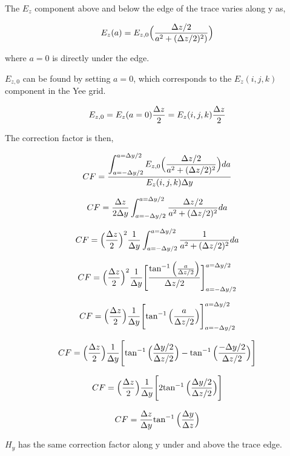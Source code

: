 \documentclass{article}
\begin{document}
The \(E_z\) component above and below the edge of the trace varies along y as,

\[E_z(a) = E_{z,0} \Big( {\Delta z /2 \over a^2 + (\Delta z / 2)^2) }\Big)\]

where \(a=0\) is directly under the edge.

\( E_{z,0}\) can be found by setting \(a=0\), which corresponds to the \(E_z(i,j,k)\) component in the Yee grid.

\[E_{z,0} = E_z(a=0)  {\Delta z \over 2} = E_z(i,j,k) {\Delta z \over 2}\]

The correction factor is then,

\[ CF = {\displaystyle \int_{a=-\Delta y /2}^{a=\Delta y / 2}  {E_{z,0} \Big( {\Delta z /2\over a^2 + (\Delta z/2)^2 }\Big)}  da \over  E_z(i,j,k) \Delta y}\]

\[ CF =  {\Delta z \over 2 \Delta y} \int_{a=-\Delta y /2}^{a=\Delta y / 2}  { {\Delta z /2 \over a^2 + (\Delta z /2)^2 }}  da \]

\[ CF = \Big({\Delta z \over 2 }\Big)^2 {1 \over \Delta y}\int_{a=-\Delta y /2}^{a=\Delta y / 2}  { {1\over a^2 + (\Delta z /2)^2 }}  da \]

\[ CF = \Big({\Delta z \over 2 }\Big)^2 {1 \over \Delta y} \Bigg[ {\tan^{-1} \Big({a \over \Delta z /2}\Big) \over \Delta z /2 } \Bigg]_{a=-\Delta y /2}^{a=\Delta y / 2}  \]

\[ CF = \Big({\Delta z \over 2 }\Big) {1 \over \Delta y} \Bigg[ {\tan^{-1} \Big({a \over \Delta z /2}\Big) } \Bigg]_{a=-\Delta y /2}^{a=\Delta y / 2}  \]

\[ CF = \Big({\Delta z \over 2 }\Big) {1 \over \Delta y} \Bigg[ {\tan^{-1} \Big({\Delta y / 2 \over \Delta z /2}\Big) - \tan^{-1} \Big({-\Delta y / 2 \over \Delta z /2}\Big)} \Bigg]\]

\[ CF = \Big({\Delta z \over 2 }\Big) {1 \over \Delta y} \Bigg[ 2{\tan^{-1} \Big({\Delta y / 2 \over \Delta z /2}\Big) } \Bigg]\]

\[ CF = {\Delta z \over \Delta y }{\tan^{-1} \Big({\Delta y \over \Delta z}\Big) } \]

\(H_y\) has the same correction factor along y under and above the trace edge.
\end{document}
